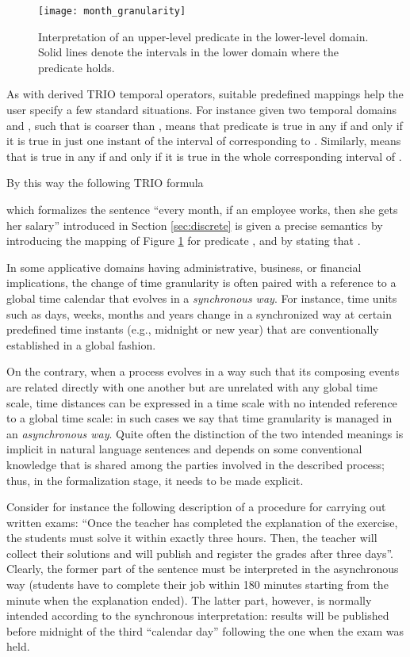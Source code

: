 \begin{figure}[htb!]
	 \centering
	 \texttt{[image: month\_granularity]}
	 \caption{Interpretation of an upper-level predicate in the lower-level domain. Solid lines denote the intervals in the lower domain where the predicate holds.}
	 \label{fig:granularity}
\end{figure}


As with derived TRIO temporal operators, suitable predefined mappings
help the user specify a few standard situations. For instance given
two temporal domains  and , such that
 is coarser than ,  means that predicate  is
true in any  if and only if it is true in just
one instant of the interval of  corresponding to
. Similarly,  means that  is true in any  if and only if
it is true in the whole corresponding interval of .

By this way the following TRIO formula

which formalizes the sentence ``every month, if an employee works,
then she gets her salary'' introduced in Section \ref{sec:discrete} is
given a precise semantics by introducing the mapping of Figure
\ref{fig:granularity} for predicate , and by stating
that .

In some applicative domains having administrative, business, or
financial implications, the change of time granularity is often paired
with a reference to a global time calendar that evolves in a
\emph{synchronous way}. For instance, time units such as days, weeks,
months and years change in a synchronized way at certain predefined
time instants (e.g., midnight or new year) that are conventionally
established in a global fashion.

On the contrary, when a process evolves in a way such that its
composing events are related directly with one another but are
unrelated with any global time scale, time distances can be expressed
in a time scale with no intended reference to a global time scale: in
such cases we say that time granularity is managed in an
\emph{asynchronous way}. Quite often the distinction of the two
intended meanings is implicit in natural language sentences and
depends on some conventional knowledge that is shared among the
parties involved in the described process; thus, in the formalization
stage, it needs to be made explicit.

Consider for instance the following description of a procedure for
carrying out written exams: ``Once the teacher has completed the
explanation of the exercise, the students must solve it within exactly
three hours. Then, the teacher will collect their solutions and will
publish and register the grades after three days''. Clearly, the
former part of the sentence must be interpreted in the asynchronous
way (students have to complete their job within 180 minutes starting
from the minute when the explanation ended). The latter part, however,
is normally intended according to the synchronous interpretation:
results will be published before midnight of the third ``calendar
day'' following the one when the exam was held.

